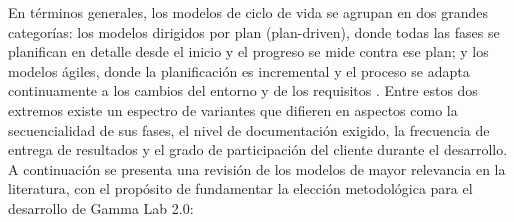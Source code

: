 \documentclass{article}
\begin{document}
En términos generales, los modelos de ciclo de vida se agrupan en dos grandes categorías: los modelos dirigidos por plan (plan-driven), donde todas las fases se planifican en detalle desde el inicio y el progreso se mide contra ese plan; y los modelos ágiles, donde la planificación es incremental y el proceso se adapta continuamente a los cambios del entorno y de los requisitos \cite{sommerville2016}. Entre estos dos extremos existe un espectro de variantes que difieren en aspectos como la secuencialidad de sus fases, el nivel de documentación exigido, la frecuencia de entrega de resultados y el grado de participación del cliente durante el desarrollo. A continuación se presenta una revisión de los modelos de mayor relevancia en la literatura, con el propósito de fundamentar la elección metodológica para el desarrollo de Gamma Lab 2.0:
\end{document}
